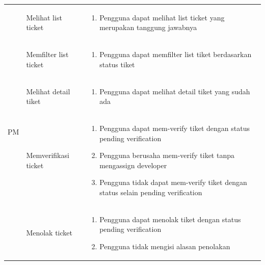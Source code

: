 \documentclass[12pt]{article}
\begin{document}
\begin{enumerate}[label=\textbf{5.\arabic*.}]
\begin{enumerate}[label=\textbf{5.2.\arabic*.}]
\begin{longtable}{ |l|l|p{}| }
            \multirow{8}{*}{PM} & Melihat list ticket     & \begin{enumerate}[label=\arabic*.] 
                                                                \item Pengguna dapat melihat list ticket yang merupakan tanggung jawabnya 
                                                            \end{enumerate}\\\cline{2-3}
                                & Memfilter list ticket & \begin{enumerate}[label=\arabic*.]
                                                                \item Pengguna dapat memfilter list tiket berdasarkan status tiket  
                                                            \end{enumerate}\\\cline{2-3}
                                & Melihat detail tiket  & \begin{enumerate}[label=\arabic*.]
                                                                \item Pengguna dapat melihat detail tiket yang sudah ada 
                                                            \end{enumerate}\\\cline{2-3}
                                & Memverifikasi ticket  & \begin{enumerate}[label=\arabic*.]
                                                                \item Pengguna dapat mem-verify tiket dengan status pending verification
                                                                \item Pengguna berusaha mem-verify tiket tanpa mengassign developer
                                                                \item Pengguna tidak dapat mem-verify tiket dengan status selain pending verification
                                                            \end{enumerate}\\\cline{2-3}
                                & Menolak ticket        & \begin{enumerate}[label=\arabic*.]
                                                                \item Pengguna dapat menolak tiket dengan status pending verification
                                                                \item Pengguna tidak mengisi alasan penolakan

\end{enumerate}
\end{longtable}
\end{enumerate}
\end{enumerate}
\end{document}
